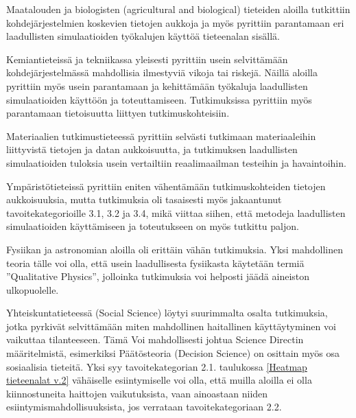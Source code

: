\documentclass[utf8]{gradu3}
\begin{document}
Maatalouden ja biologisten (agricultural and biological) tieteiden aloilla
tutkittiin kohdejärjestelmien koskevien tietojen aukkoja ja myös pyrittiin
parantamaan eri laadullisten simulaatioiden työkalujen käyttöä tieteenalan
sisällä.

Kemiantieteissä ja tekniikassa yleisesti 
pyrittiin usein selvittämään kohdejärjestelmässä mahdollisia 
ilmestyviä vikoja tai riskejä.
Näillä aloilla pyrittiin myös usein parantamaan ja 
kehittämään työkaluja laadullisten simulaatioiden käyttöön ja toteuttamiseen.
Tutkimuksissa pyrittiin myös parantamaan tietoisuutta liittyen tutkimuskohteisiin.

Materiaalien tutkimustieteessä pyrittiin selvästi 
tutkimaan materiaaleihin  liittyvistä tietojen ja datan aukkoisuutta, 
ja tutkimuksen laadullisten simulaatioiden tuloksia usein vertailtiin reaalimaailman testeihin ja havaintoihin.

Ympäristötieteissä pyrittiin eniten vähentämään tutkimuskohteiden tietojen aukkoisuuksia, mutta tutkimuksia oli tasaisesti myös jakaantunut tavoitekategorioille 3.1, 3.2 ja 3.4, mikä viittaa siihen, että
metodeja laadullisten simulaatioiden käyttämiseen ja toteutukseen on myös
tutkittu paljon.

Fysiikan ja astronomian aloilla oli erittäin vähän tutkimuksia.
Yksi mahdollinen teoria tälle voi olla,
että usein laadullisesta fysiikasta käytetään termiä ''Qualitative Physics'', jolloinka tutkimuksia voi helposti jäädä aineiston ulkopuolelle.

Yhteiskuntatieteessä (Social Science) löytyi suurimmalta osalta tutkimuksia, 
jotka pyrkivät selvittämään miten mahdollinen haitallinen käyttäytyminen voi vaikuttaa tilanteeseen. Tämä Voi mahdollisesti johtua Science Directin määritelmistä, esimerkiksi
Päätösteoria (Decision Science) on osittain myös osa sosiaalisia tieteitä. 
Yksi syy tavoitekategorian 2.1. taulukossa \ref{Heatmap tieteenalat v.2}
vähäiselle esiintymiselle voi olla, 
että muilla aloilla ei olla kiinnostuneita haittojen vaikutuksista,
vaan ainoastaan niiden esiintymismahdollisuuksista, 
jos verrataan tavoitekategoriaan 2.2.
\end{document}
